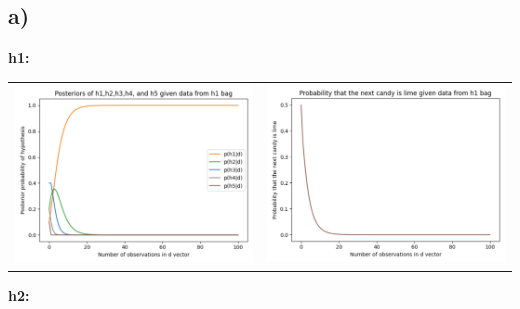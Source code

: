 \documentclass[]{article}
\begin{document}
\subsection*{a)}
\textbf{h1:}
\begin{center}
    \begin{tabular}{cc}
    \includegraphics[scale = 0.30]{2_a_posteriors_h1.png} & \includegraphics[scale = 0.30]{2_a_lime_h1.png} 
\end{tabular}
\end{center}
\textbf{h2:}
\end{document}

